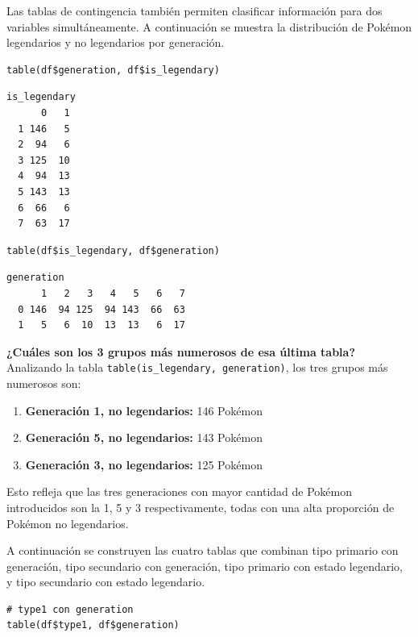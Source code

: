 \documentclass[11pt,a4paper]{article}
\begin{document}
Las tablas de contingencia también permiten clasificar información para dos variables simultáneamente.
A continuación se muestra la distribución de Pokémon legendarios y no legendarios por generación.

\begin{lstlisting}[style=Rstyle]
table(df$generation, df$is_legendary)
\end{lstlisting}

\begin{lstlisting}[style=Routput]
   is_legendary
      0   1
  1 146   5
  2  94   6
  3 125  10
  4  94  13
  5 143  13
  6  66   6
  7  63  17
\end{lstlisting}

\begin{lstlisting}[style=Rstyle]
table(df$is_legendary, df$generation)
\end{lstlisting}

\begin{lstlisting}[style=Routput]
   generation
      1   2   3   4   5   6   7
  0 146  94 125  94 143  66  63
  1   5   6  10  13  13   6  17
\end{lstlisting}

\begin{pregunta}
\textbf{¿Cuáles son los 3 grupos más numerosos de esa última tabla?}\\[4pt]
Analizando la tabla \texttt{table(is\_legendary, generation)}, los tres grupos más numerosos son:\\
\begin{enumerate}
  \item \textbf{Generación 1, no legendarios:} 146 Pokémon
  \item \textbf{Generación 5, no legendarios:} 143 Pokémon
  \item \textbf{Generación 3, no legendarios:} 125 Pokémon
\end{enumerate}
Esto refleja que las tres generaciones con mayor cantidad de Pokémon introducidos son la 1, 5 y 3 respectivamente,
todas con una alta proporción de Pokémon no legendarios.
\end{pregunta}

A continuación se construyen las cuatro tablas que combinan tipo primario con generación, tipo
secundario con generación, tipo primario con estado legendario, y tipo secundario con estado legendario.

\begin{lstlisting}[style=Rstyle]
# type1 con generation
table(df$type1, df$generation)
\end{lstlisting}
\end{document}
